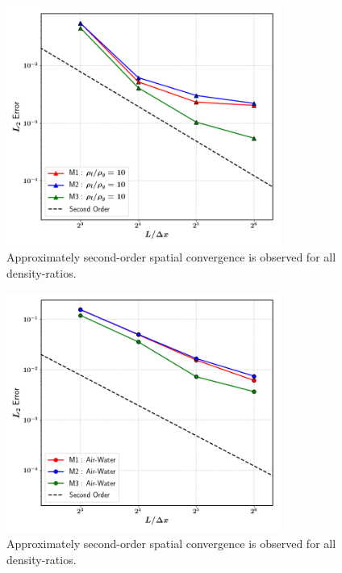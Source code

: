 \begin{figure}[h!]
    \centering
    \includegraphics[width = 0.8\textwidth]{plots/capwave/conv_r10.png}
    \caption{Approximately second-order spatial convergence is observed for all density-ratios.}
    \label{conv_r10}
\end{figure}

\begin{figure}[h!]
    \centering
    \includegraphics[width = 0.8\textwidth]{plots/capwave/conv_aw.png}
    \caption{Approximately second-order spatial convergence is observed for all density-ratios.}
    \label{conv_aw}
\end{figure}

